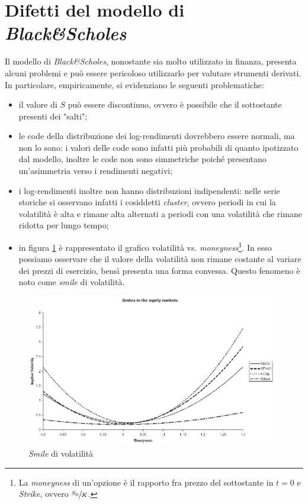 \documentclass[a4paper,10pt]{report}
\theoremstyle{plain}
\theoremstyle{definition}
\theoremstyle{remark}
\begin{document}
\section{Difetti del modello di \emph{Black\&Scholes}}
Il modello di \emph{Black\&Scholes}, nonostante sia molto utilizzato in finanza, presenta alcuni problemi e pu\`o essere pericoloso utilizzarlo per valutare strumenti derivati. In particolare, empiricamente, si evidenziano le seguenti problematiche:
\begin{itemize}
\item il valore di $S$ pu\`o essere discontinuo, ovvero \`e possibile che il sottostante presenti dei "salti";
\item le code della distribuzione dei log-rendimenti dovrebbero essere normali, ma non lo sono: i valori delle code sono infatti pi\`u probabili di quanto ipotizzato dal modello, inoltre le code non sono simmetriche poich\'e presentano un'asimmetria verso i rendimenti negativi;
\item i log-rendimenti inoltre non hanno distribuzioni indipendenti: nelle serie storiche si osservano infatti i cosiddetti \emph{cluster}, ovvero periodi in cui la volatilit\`a \`e alta e rimane alta alternati a periodi con una volatilit\`a che rimane ridotta per lungo tempo;
\item in figura \ref{smile} \`e rappresentato il grafico volatilit\`a vs. \emph{moneyness}\footnote{La \emph{moneyness} di un'opzione \`e il rapporto fra prezzo del sottostante in $t=0$ e \emph{Strike}, ovvero $\sfrac{S_0}{K}$.}. In esso possiamo osservare che il valore della volatilit\`a non rimane costante al variare dei prezzi di esercizio, bens\`i presenta una forma convessa. Questo fenomeno \`e noto come \emph{smile} di volatilit\`a.
\end{itemize}
\begin{figure}[htbp!]
\begin{center}
\includegraphics[width=11cm]{img/smile.jpg}
\caption{\emph{Smile} di volatilit\`a}
\label{smile}
\end{center}
\end{figure}
\end{document}
